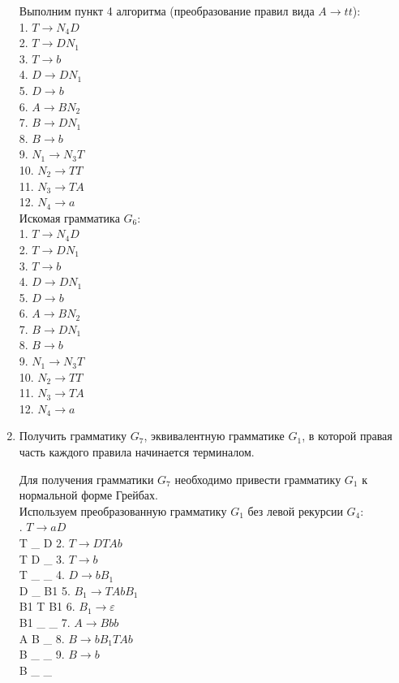 \documentclass[a4paper,14pt]{extarticle}
\begin{document}
\begin{enumerate}[1.]
Выполним пункт 4 алгоритма (преобразование правил вида $A \rightarrow tt$):\\
1. $T \rightarrow N_4D$\\
2. $T \rightarrow DN_1$\\
3. $T \rightarrow b$\\
4. $D \rightarrow DN_1$\\
5. $D \rightarrow b$\\
6. $A \rightarrow BN_2$\\
7. $B \rightarrow DN_1$\\
8. $B \rightarrow b$\\
9. $N_1 \rightarrow N_3T$\\
10. $N_2 \rightarrow TT$\\
11. $N_3 \rightarrow TA$\\
12. $N_4 \rightarrow a$\\

Искомая грамматика $G_6$:\\
1. $T \rightarrow N_4D$\\
2. $T \rightarrow DN_1$\\
3. $T \rightarrow b$\\
4. $D \rightarrow DN_1$\\
5. $D \rightarrow b$\\
6. $A \rightarrow BN_2$\\
7. $B \rightarrow DN_1$\\
8. $B \rightarrow b$\\
9. $N_1 \rightarrow N_3T$\\
10. $N_2 \rightarrow TT$\\
11. $N_3 \rightarrow TA$\\
12. $N_4 \rightarrow a$\\

\item Получить грамматику $G_7$, эквивалентную грамматике $G_1$, в которой 
правая часть каждого правила начинается терминалом.

Для получения грамматики $G_7$ 
необходимо привести грамматику $G_1$ 
к нормальной форме Грейбах.\\

Используем преобразованную грамматику $G_1$ без левой рекурсии $G_4$:\\
. $T \rightarrow aD$\\              T  _  D
2. $T \rightarrow DTAb$\\            T  D  _
3. $T \rightarrow b$\\               T  _  _
4. $D \rightarrow bB_1$\\            D  _  B1
5. $B_1 \rightarrow TAbB_1$\\        B1 T  B1
6. $B_1 \rightarrow \varepsilon$\\   B1 _  _
7. $A \rightarrow Bbb$\\             A  B  _
8. $B \rightarrow bB_1TAb$\\         B  _  _
9. $B \rightarrow b$\\               B  _  _


\end{enumerate}
\end{document}
